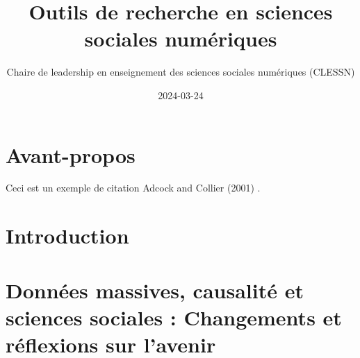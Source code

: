 \documentclass[
  letterpaper,
]{scrbook}
\title{Outils de recherche en sciences sociales numériques}
\author{Chaire de leadership en enseignement des sciences sociales
numériques (CLESSN)}
\date{2024-03-24}
\renewcommand*\contentsname{Table of contents}
\newcommand\contentsname{Table of contents}
\begin{document}
\frontmatter
\maketitle
\ifdefined\Shaded\renewenvironment{Shaded}{\begin{tcolorbox}[boxrule=0pt, sharp corners, breakable, borderline west={3pt}{0pt}{shadecolor}, enhanced, interior hidden, frame hidden]}{\end{tcolorbox}}\fi

\renewcommand*\contentsname{Table of contents}
{
\setcounter{tocdepth}{2}
\tableofcontents
}
\mainmatter
{}

\hypertarget{avant-propos}{%
\chapter*{Avant-propos}\label{avant-propos}}


Ceci est un exemple de citation Adcock and Collier (2001) .


\hypertarget{introduction}{%
\chapter*{Introduction}\label{introduction}}



\hypertarget{donnuxe9es-massives-causalituxe9-et-sciences-sociales-changements-et-ruxe9flexions-sur-lavenir}{%
\chapter{Données massives, causalité et sciences sociales : Changements
et réflexions sur
l'avenir}\label{donnuxe9es-massives-causalituxe9-et-sciences-sociales-changements-et-ruxe9flexions-sur-lavenir}}
\end{document}
